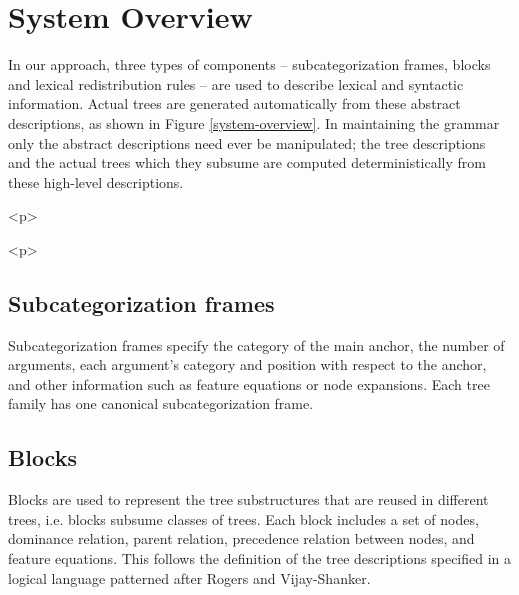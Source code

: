  
 
 
\section{System Overview} 
 
In our approach,  
three types of components -- subcategorization frames, blocks and 
lexical redistribution rules -- are used to describe lexical and 
syntactic information. 
Actual trees are generated automatically from these abstract descriptions, 
as shown in Figure \ref{system-overview}. 
In maintaining the grammar only the abstract 
descriptions need ever be manipulated; the tree descriptions and the 
actual trees which they subsume are computed deterministically from these 
high-level descriptions. 
 
 
\begin{rawhtml} <p> \end{rawhtml}
\centerline{} 
\begin{rawhtml} <dl> <dt>{Lexical Organization: System Overview <p> </dl> \end{rawhtml}
\label{system-overview} 
\begin{rawhtml} <p> \end{rawhtml}
 
\subsection{Subcategorization frames} 
Subcategorization frames specify 
the category of the main anchor, 
the number of  arguments, 
each argument's category and position with respect to the anchor, 
and other information 
such as feature equations or node expansions. 
Each tree family has one canonical subcategorization frame. 
 
\subsection{Blocks} 
 
Blocks are used to represent the tree substructures that are reused 
in different trees, i.e. blocks 
subsume classes of trees. Each block includes 
a set of nodes, dominance relation, parent relation, 
precedence relation between nodes, 
and feature equations. This follows the definition of the tree 
descriptions specified in a logical language patterned after Rogers and 
Vijay-Shanker\cite{rogers-vijay94}. 
 
